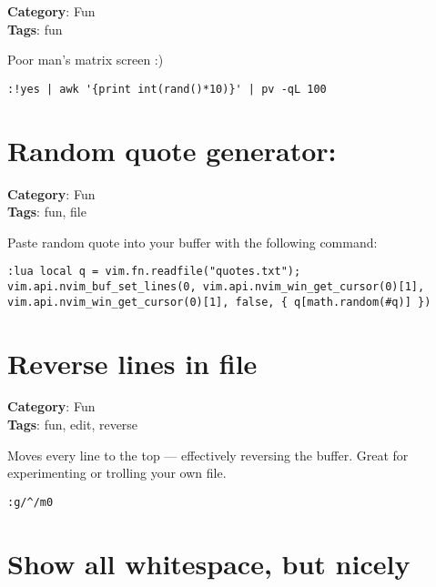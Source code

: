 {{{{{{\textbf{Category}: Fun\\ \textbf{Tags}: fun
\vspace{0.5cm}

Poor man's matrix screen :)

\begin{Exa*}{}
\begin{Verbatim}[fontsize=\footnotesize, breaklines, breakanywhere]
:!yes | awk '{print int(rand()*10)}' | pv -qL 100
\end{Verbatim}
\end{Exa*}

\section{Random quote generator:}

\textbf{Category}: Fun\\ \textbf{Tags}: fun, file
\vspace{0.5cm}

Paste random quote into your buffer with the following command:

\begin{Exa*}{}
\begin{Verbatim}[fontsize=\footnotesize, breaklines, breakanywhere]
:lua local q = vim.fn.readfile("quotes.txt"); vim.api.nvim_buf_set_lines(0, vim.api.nvim_win_get_cursor(0)[1], vim.api.nvim_win_get_cursor(0)[1], false, { q[math.random(#q)] })
\end{Verbatim}
\end{Exa*}

\section{Reverse lines in file}

\textbf{Category}: Fun\\ \textbf{Tags}: fun, edit, reverse
\vspace{0.5cm}

Moves every line to the top — effectively reversing the buffer. Great for experimenting or trolling your own file.

\begin{Exa*}{}
\begin{Verbatim}[fontsize=\footnotesize, breaklines, breakanywhere]
:g/^/m0
\end{Verbatim}
\end{Exa*}

\section{Show all whitespace, but nicely}

}}}}}}
